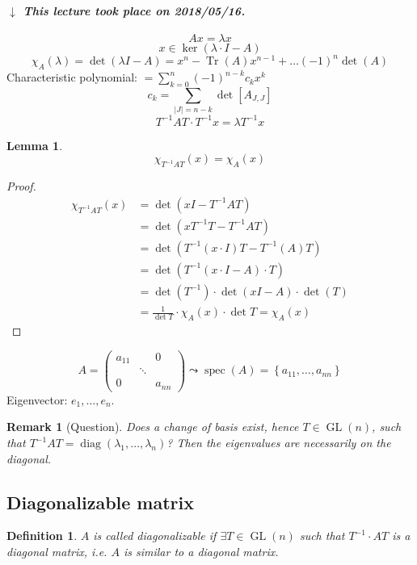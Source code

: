\documentclass{article}
\newtheorem{definition}{Definition}  \numberwithin{definition}{section}
\newtheorem{lemma}{Lemma}  \numberwithin{lemma}{section}
\newtheorem{remark}{Remark}  \numberwithin{remark}{section}
\newcommand{\set}[1]{\left\{#1\right\}}
\newcommand{\card}[1]{\left|#1\right|}
\newcommand{\dateref}[1]{%
  \begin{mdframed}[backgroundcolor=gray!10,innerbottommargin=0pt,innertopmargin=0pt]
    \paragraph{\textit{$\downarrow$ This lecture took place on #1.}}%
  \end{mdframed}%
}
\begin{document}
\dateref{2018/05/16}

\[ Ax = \lambda x \]
\[ x \in \ker(\lambda \cdot I - A) \]
\[ \chi_A(\lambda) = \det(\lambda I - A) = x^n - \operatorname{Tr}(A) x^{n-1} + \dots (-1)^n \det(A) \]
Characteristic polynomial: $= \sum_{k=0}^n (-1)^{n-k} c_k x^k$
\[ c_k = \sum_{\card{J} = n-k} \det[A_{J,J}] \]
\[ T^{-1} AT \cdot T^{-1} x = \lambda T^{-1} x \]

\begin{lemma} %
  \[ \chi_{T^{-1} AT}(x) = \chi_A(x) \]
\end{lemma}
\begin{proof}
  \begin{align*}
    \chi_{T^{-1}AT}(x) &= \det(xI - T^{-1}AT) \\
      &= \det(x T^{-1} T - T^{-1} AT) \\
      &= \det(T^{-1} (x \cdot I) T - T^{-1} (A) T) \\
      &= \det(T^{-1}(x \cdot I - A) \cdot T) \\
      &= \det(T^{-1}) \cdot \det(xI - A) \cdot \det(T) \\
      &= \frac{1}{\det{T}} \cdot \chi_A(x) \cdot \det{T} = \chi_A(x)
  \end{align*}
\end{proof}

\[ A = \begin{pmatrix} a_{11} & & 0 \\ & \ddots & \\ 0 & & a_{nn} \end{pmatrix} \leadsto \operatorname{spec}(A) = \set{a_{11}, \dots, a_{nn}} \]
Eigenvector: $e_1, \dots, e_n$.

\begin{remark}[Question]
  Does a change of basis exist, hence $T \in \operatorname{GL}(n)$, such that $T^{-1} AT = \operatorname{diag}(\lambda_1, \dots, \lambda_n)$?
  Then the eigenvalues are necessarily on the diagonal.
\end{remark}

\subsection{Diagonalizable matrix}

\begin{definition} %
  $A$ is called \emph{diagonalizable} if $\exists T \in \operatorname{GL}(n)$ such that $T^{-1} \cdot AT$ is a diagonal matrix,
  i.e. $A$ is \emph{similar} to a diagonal matrix.
\end{definition}
\end{document}

